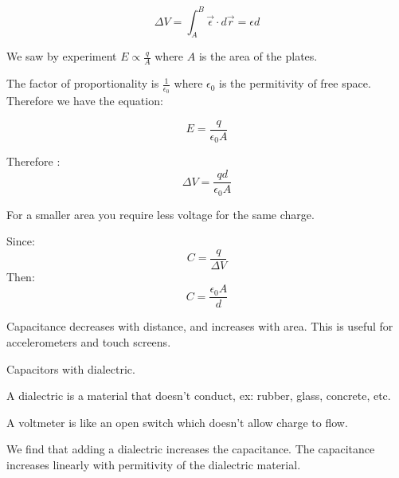 \documentclass{report}
\begin{document}
\begin{description}
\begin{mdframed}
            \begin{displaymath}
                \Delta V = \int_A^B \vec{\epsilon} \cdot d\vec{r}
                = \epsilon d
            \end{displaymath}
            
            We saw by experiment $E \propto \frac{q}{A}$ where
            $A$ is the area of the plates.

            The factor of proportionality is $\frac{1}{\epsilon_0}$
            where  $\epsilon_0$ is the permitivity of free space.
            Therefore we have the equation:

            \begin{displaymath}
                E = \frac{q}{\epsilon_0 A}
            \end{displaymath}

            Therefore :
            \begin{displaymath}
                \Delta V = \frac{qd}{\epsilon_0 A}
            \end{displaymath}
            
            For a smaller area you require less voltage for the
            same charge.

            Since:
            \begin{displaymath}
                C = \frac{q}{\Delta V}
            \end{displaymath}
            Then:
            \begin{displaymath}
                C = \frac{\epsilon_0 A}{d}
            \end{displaymath}

            Capacitance decreases with distance, and increases
            with area. This is useful for accelerometers and
            touch screens.
        \end{mdframed}
        \begin{mdframed}
            Capacitors with dialectric.

            \vspace{10pt}

            A dialectric is a material that doesn't conduct,
            ex: rubber, glass, concrete, etc.


            A voltmeter is like an open switch which doesn't allow
            charge to flow.

            We find that adding a dialectric increases the capacitance.
            The capacitance increases linearly with permitivity of the
            dialectric material.


\end{mdframed}
\end{description}
\end{document}
